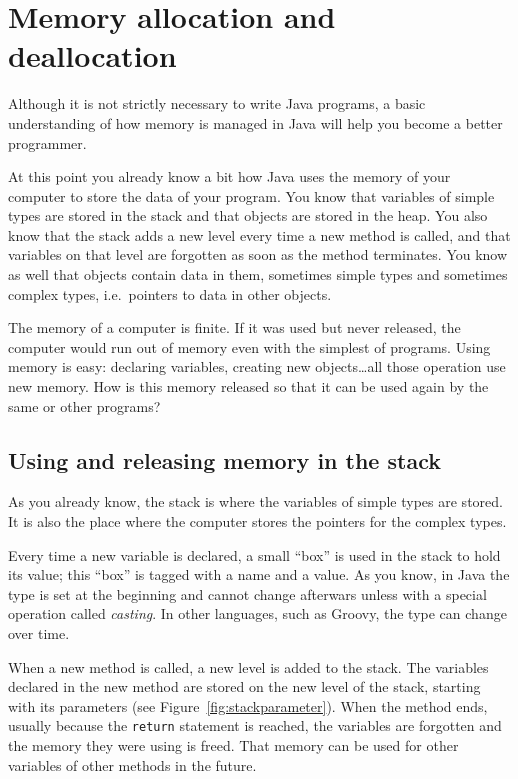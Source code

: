 \section{Memory allocation and deallocation}
\label{sec:memory-alloc-deall}

Although it is not strictly necessary to write Java programs, a basic
understanding of how memory is managed in Java will help you become a
better programmer. 

At this point you already know a bit how Java uses the memory of your
computer to store the data of your program. You know that variables of
simple types are stored in the stack and that objects are stored in
the heap. You also know that the stack adds a new level every time a
new method is called, and that variables on that level are forgotten
as soon as the method terminates. You know as well that objects 
contain data in them, sometimes simple types and sometimes complex
types, i.e.~pointers to data in other objects. 

The memory of a computer is finite. If it was used but never released,
the computer would run out of memory even with the simplest of
programs. Using memory is easy: declaring variables, creating new
objects\ldots all those operation use new memory. How is this memory
released so that it can be used again by the same or other programs?

\subsection{Using and releasing memory in the stack}
\label{sec:using-rele-stack}

As you already know, the stack is where the variables of simple types
are stored. It is also the place where the computer stores the
pointers for the complex types. 

Every time a new variable is declared, a small ``box'' is used in the
stack to hold its value; this ``box'' is tagged
with a name and a value. As you know, in Java the type is set at the
beginning and cannot change afterwars unless with a special operation
called \emph{casting}. In other languages, such as Groovy, the type
can change over time. 

When a new method is called, a new level is added to the stack. The
variables declared in the new method are stored on the new level of the
stack, starting with its parameters (see Figure~\ref{fig:stackparameter}). 
When the method ends, usually because the \verb+return+
statement is reached, the variables are forgotten and the memory they
were using is freed. That memory can be used for other variables of
other methods in the future. 

